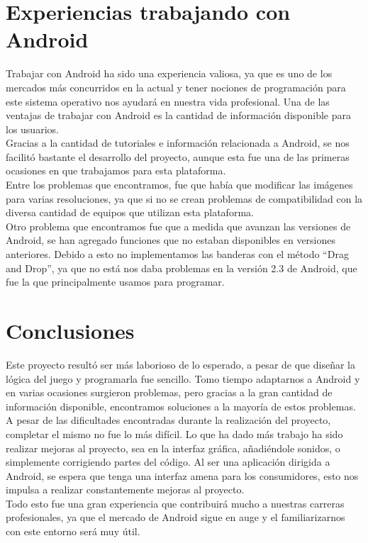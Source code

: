 \documentclass[12pt]{article}
\begin{document}
\section{Experiencias trabajando con Android}
Trabajar con Android ha sido una experiencia valiosa, ya que es uno de los mercados más concurridos en la actual y tener nociones de programación para este sistema operativo nos ayudará en nuestra vida profesional. Una de las ventajas de trabajar con Android es la cantidad de información disponible para los usuarios. \\Gracias a la cantidad de tutoriales e información relacionada a Android, se nos facilitó bastante el desarrollo del proyecto, aunque esta fue una de las primeras ocasiones en que trabajamos para esta plataforma.
\\Entre los problemas que encontramos, fue que había que modificar las imágenes para varias resoluciones, ya que si no se crean problemas de compatibilidad con la diversa cantidad de equipos que utilizan esta plataforma.
\\Otro problema que encontramos fue que a medida que avanzan las versiones de Android, se han agregado funciones que no estaban disponibles en versiones anteriores. Debido a esto no implementamos las banderas con el método “Drag and Drop”, ya que no está nos daba problemas en la versión 2.3 de Android, que fue la que principalmente usamos para programar.

\section{Conclusiones}
Este proyecto resultó ser más laborioso de lo esperado, a pesar de que diseñar la lógica del juego y programarla fue sencillo. Tomo tiempo adaptarnos a Android y en varias ocasiones surgieron problemas, pero gracias a la gran cantidad de información disponible, encontramos soluciones a la mayoría de estos problemas. 
\\A pesar de las dificultades encontradas durante la realización del proyecto, completar el mismo no fue lo más difícil. Lo que ha dado más trabajo ha sido realizar mejoras al proyecto, sea en la interfaz gráfica, añadiéndole sonidos, o simplemente corrigiendo partes del código. Al ser una aplicación dirigida a Android, se espera que tenga una interfaz amena para los consumidores, esto nos impulsa a realizar constantemente mejoras al proyecto. 
\\Todo esto fue una gran experiencia que contribuirá mucho a nuestras carreras profesionales, ya que el mercado de Android sigue en auge y el familiarizarnos con este entorno será muy útil. 
\end{document}
